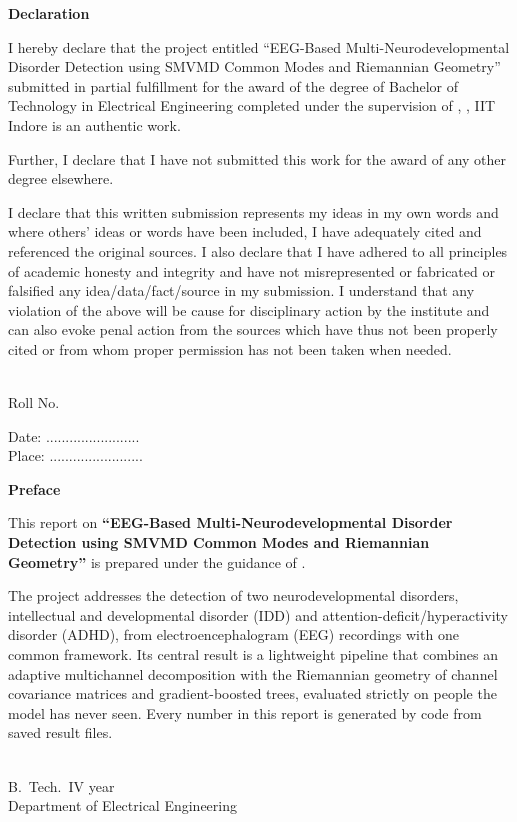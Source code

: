 \newpage
\begin{center}{\Large\bf Declaration}\end{center}
\par I hereby declare that the project entitled ``EEG-Based Multi-Neurodevelopmental Disorder
Detection using SMVMD Common Modes and Riemannian Geometry'' submitted in partial fulfillment for
the award of the degree of Bachelor of Technology in Electrical Engineering completed under the
supervision of \SupervisorName, \SupervisorDetails, IIT Indore is an authentic work.
\par Further, I declare that I have not submitted this work for the award of any other degree elsewhere.
\par I declare that this written submission represents my ideas in my own words and where
others' ideas or words have been included, I have adequately cited and referenced the original
sources. I also declare that I have adhered to all principles of academic honesty and integrity
and have not misrepresented or fabricated or falsified any idea/data/fact/source in my submission.
I understand that any violation of the above will be cause for disciplinary action by the
institute and can also evoke penal action from the sources which have thus not been properly
cited or from whom proper permission has not been taken when needed.
\vspace{2cm}
\begin{flushright}\StudentName\\ Roll No.\ \RollNo\end{flushright}
\begin{flushleft}Date: ........................\\ Place: ........................\end{flushleft}

\newpage
\begin{center}{\Large\bf Preface}\end{center}
This report on \textbf{``EEG-Based Multi-Neurodevelopmental Disorder Detection using SMVMD
Common Modes and Riemannian Geometry''} is prepared under the guidance of \SupervisorName.

The project addresses the detection of two neurodevelopmental disorders, intellectual and
developmental disorder (IDD) and attention-deficit/hyperactivity disorder (ADHD), from
electroencephalogram (EEG) recordings with one common framework. Its central result is a
lightweight pipeline that combines an adaptive multichannel decomposition with the Riemannian
geometry of channel covariance matrices and gradient-boosted trees, evaluated strictly on people
the model has never seen. Every number in this report is generated by code from saved result
files.
\vspace{2cm}
\begin{flushleft}\StudentName\\ B.\ Tech.\ IV year\\ Department of Electrical Engineering\end{flushleft}

